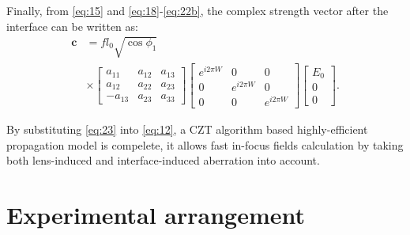 \documentclass[9pt,twocolumn,twoside]{osajnl}
\begin{document}
Finally, from \eqref{eq:15} and \eqref{eq:18}-\eqref{eq:22b}, the complex strength vector after the interface can be written as:
	\begin{equation}
		\begin{aligned}\label{eq:23}
			\mathbf{c}&=f l_0\sqrt{\cos\phi_1}\\
			&\times\begin{bmatrix}
				a_{11} & a_{12} & a_{13}\\
				a_{12} & a_{22} & a_{23}\\
				-a_{13} & a_{23} & a_{33}
				\end{bmatrix}
				\begin{bmatrix}
					e^{i2\pi W}&0&0\\
					0&e^{i2\pi W}&0\\
					0&0&e^{i2\pi W}
				\end{bmatrix}
				\begin{bmatrix}
					E_0\\
					0\\
					0
				\end{bmatrix}.
		\end{aligned}
	\end{equation}	

By substituting \eqref{eq:23} into \eqref{eq:12}, a CZT algorithm based highly-efficient propagation model is compelete, it allows fast in-focus fields calculation by taking both lens-induced and interface-induced aberration into account.

\section{Experimental arrangement}
\end{document}
